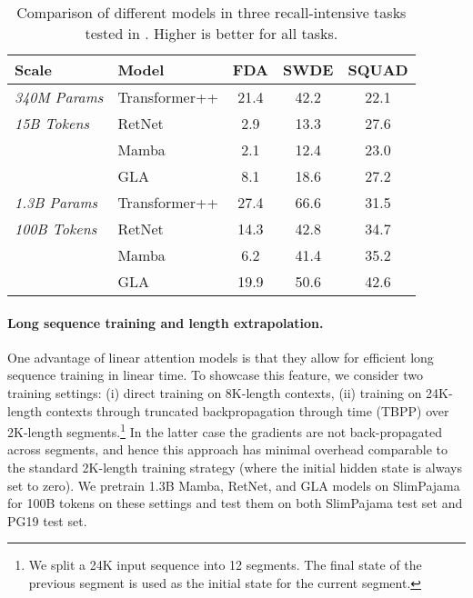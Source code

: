 \begin{table}

\centering
\small 
        \begin{tabular}{l lccc}
        \toprule[0.5mm]
  \textbf{Scale} &   \textbf{Model}  &  \textbf{FDA} & \textbf{SWDE} & \textbf{SQUAD} \\
      \bottomrule
 \textit{340M Params}  &   Transformer++ &  21.4 & 42.2 & 22.1 \\
 \textit{15B Tokens}  &   RetNet & 2.9 & 13.3 & 27.6 \\
   &   Mamba & 2.1 & 12.4 & 23.0 \\
   &   GLA  & 8.1 & 18.6 & 27.2 \\      
      \midrule
 \textit{1.3B Params}   &   Transformer++ & 27.4 & 66.6 & 31.5 \\
 \textit{100B Tokens}   &   RetNet & 14.3 & 42.8 & 34.7 \\
   &   Mamba &  6.2 & 41.4 & 35.2 \\
   &   GLA  & 19.9 &  50.6 & 42.6 \\      
    \bottomrule
    \end{tabular}
    \vspace{-2mm}
    \caption{Comparison of different models in three recall-intensive tasks tested in \citet{Arora2024SimpleLA}. Higher is better for all tasks. 
    }
    \label{tab:recall-intensive}
\end{table}

\vspace{-2mm}
\paragraph{Long sequence training and length extrapolation.} 
One advantage of linear attention models is that they allow for efficient long sequence training in linear time.
To showcase this feature, we consider two training settings: (i) direct training on 8K-length contexts, (ii) training on 24K-length contexts through {truncated backpropagation through time} (TBPP) over 2K-length segments.\footnote{We split a 24K input sequence into 12 segments. The final state of the previous segment is used as the initial state for the current segment.} In the latter case the gradients are not back-propagated across segments, and hence this approach has minimal overhead comparable to the standard 2K-length training strategy (where the initial hidden state is always set to zero). We pretrain 1.3B Mamba, RetNet, and GLA models on SlimPajama for 100B tokens on these settings and test them on both SlimPajama test set and PG19 \citep{pg19} test set. 

